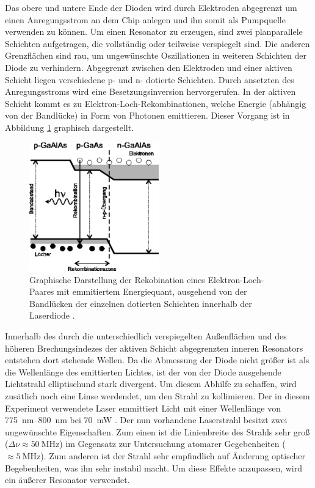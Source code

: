 Das obere und untere Ende der Dioden wird durch Elektroden abgegrenzt um einen
Anregungsstrom an dem Chip anlegen und ihn somit als Pumpquelle verwenden zu
können. Um einen Resonator zu erzeugen, sind zwei planparallele Schichten
aufgetragen, die vollständig oder teilweise verspiegelt sind. Die anderen
Grenzflächen sind rau, um ungewünschte Oszillationen in weiteren Schichten der
Diode zu verhindern. Abgegrenzt zwischen den Elektroden und einer aktiven Schicht
liegen verschiedene p- und n- dotierte Schichten. Durch ansetzten des
Anregungsstroms wird eine Besetzungsinversion hervorgerufen. In der aktiven
Schicht kommt es zu Elektron-Loch-Rekombinationen, welche Energie (abhängig von der
Bandlücke) in Form von Photonen emittieren. Dieser Vorgang ist in Abbildung
\ref{fig:recombition} graphisch dargestellt.
\begin{figure}[htb]
  \centering
  \includegraphics[width=0.5\textwidth]{images/recombition.pdf}
  \caption{Graphische Darstellung der Rekobination eines Elektron-Loch-Paares mit
  emmitiertem Energiequant, ausgehend von der Bandlücken der einzelnen dotierten
  Schichten innerhalb der Laserdiode \cite{recomb}.}
  \label{fig:recombition}
\end{figure}

Innerhalb des durch die unterschiedlich
verspiegelten Außenflächen und des höheren Brechungsindezes der aktiven Schicht
abgegrenzten inneren Resonators entstehen dort stehende Wellen. Da die Abmessung
der Diode nicht größer ist als die Wellenlänge des emittierten Lichtes, ist der
von der Diode ausgehende Lichtstrahl elliptischund stark divergent. Um diesem
Abhilfe zu schaffen, wird zusätlich noch eine Linse werdendet, um den Strahl zu
kollimieren.
Der in diesem Experiment verwendete Laser emmittiert Licht
mit einer Wellenlänge von \SIrange{775}{800}{\nano\meter} bei \SI{70}{\milli\watt}
\cite{Sanyo}.
Der nun vorhandene Laserstrahl besitzt zwei ungewünschte Eigenschaften. Zum einen
ist die Linienbreite des Strahls sehr groß ($\Delta\nu \approx \SI{50}{\mega\hertz}$)
im Gegensatz zur Untersuchung atomarer Gegebenheiten ($ \approx \SI{5}{\mega\hertz}$).
Zum anderen ist der Strahl sehr empfindlich auf Änderung optischer Begebenheiten,
was ihn sehr instabil macht. Um diese Effekte anzupassen, wird ein äußerer
Resonator verwendet.

